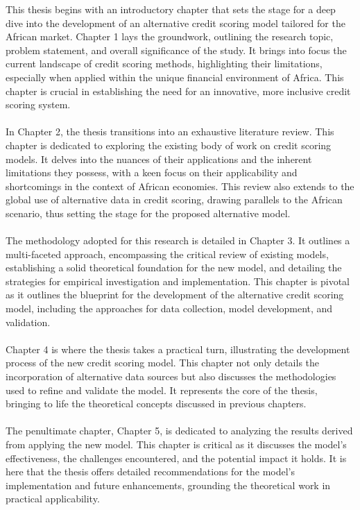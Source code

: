 \documentclass[a4paper,11pt,fleqn]{report}
\begin{document}
This thesis begins with an introductory chapter that sets the stage for a deep dive into the development of an alternative credit scoring model tailored for the African market. Chapter 1 lays the groundwork, outlining the research topic, problem statement, and overall significance of the study. It brings into focus the current landscape of credit scoring methods, highlighting their limitations, especially when applied within the unique financial environment of Africa. This chapter is crucial in establishing the need for an innovative, more inclusive credit scoring system.
\\\\
In Chapter 2, the thesis transitions into an exhaustive literature review. This chapter is dedicated to exploring the existing body of work on credit scoring models. It delves into the nuances of their applications and the inherent limitations they possess, with a keen focus on their applicability and shortcomings in the context of African economies. This review also extends to the global use of alternative data in credit scoring, drawing parallels to the African scenario, thus setting the stage for the proposed alternative model.
\\\\
The methodology adopted for this research is detailed in Chapter 3. It outlines a multi-faceted approach, encompassing the critical review of existing models, establishing a solid theoretical foundation for the new model, and detailing the strategies for empirical investigation and implementation. This chapter is pivotal as it outlines the blueprint for the development of the alternative credit scoring model, including the approaches for data collection, model development, and validation.
\\\\
Chapter 4 is where the thesis takes a practical turn, illustrating the development process of the new credit scoring model. This chapter not only details the incorporation of alternative data sources but also discusses the methodologies used to refine and validate the model. It represents the core of the thesis, bringing to life the theoretical concepts discussed in previous chapters.
\\\\
The penultimate chapter, Chapter 5, is dedicated to analyzing the results derived from applying the new model. This chapter is critical as it discusses the model's effectiveness, the challenges encountered, and the potential impact it holds. It is here that the thesis offers detailed recommendations for the model’s implementation and future enhancements, grounding the theoretical work in practical applicability.
\end{document}
